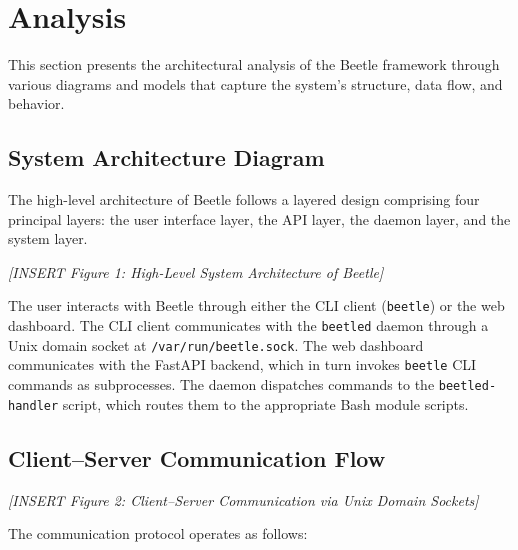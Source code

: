 \pagebreak
\section{Analysis}

This section presents the architectural analysis of the Beetle framework through various diagrams and models that capture the system's structure, data flow, and behavior.

\subsection{System Architecture Diagram}

The high-level architecture of Beetle follows a layered design comprising four principal layers: the user interface layer, the API layer, the daemon layer, and the system layer.

\vspace{0.5cm}
\noindent\textit{[INSERT Figure 1: High-Level System Architecture of Beetle]}
\vspace{0.5cm}

The user interacts with Beetle through either the CLI client (\texttt{beetle}) or the web dashboard. The CLI client communicates with the \texttt{beetled} daemon through a Unix domain socket at \texttt{/var/run/beetle.sock}. The web dashboard communicates with the FastAPI backend, which in turn invokes \texttt{beetle} CLI commands as subprocesses. The daemon dispatches commands to the \texttt{beetled-handler} script, which routes them to the appropriate Bash module scripts.

\subsection{Client--Server Communication Flow}

\vspace{0.5cm}
\noindent\textit{[INSERT Figure 2: Client--Server Communication via Unix Domain Sockets]}
\vspace{0.5cm}

The communication protocol operates as follows:

